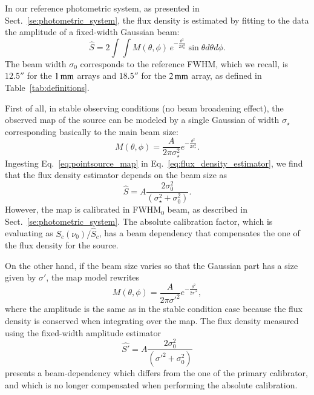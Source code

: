 In our reference photometric system, as presented in
Sect.~\ref{se:photometric_system}, 
the flux density is estimated by fitting to the data the amplitude of a fixed-width
Gaussian beam:
\begin{equation}
  \hat{S}  = 2 \int \int M(\theta, \phi)\, e^{-\frac{\theta^{2}}{2\sigma_{0}^{2}}} \sin \theta d\theta d\phi.
  \label{eq:flux_density_estimator}
\end{equation}
The beam width $\sigma_{0}$ corresponds to the
reference FWHM, which we recall, is $12.5''$ for the $1\,\rm{mm}$ arrays and $18.5''$ for
the $2\,\rm{mm}$ array, as defined in Table~\ref{tab:definitions}.

First of all, in stable observing conditions (no beam
broadening effect), the observed map of the source can be modeled by a single Gaussian of
width $\sigma_\star$ corresponding basically to the main beam size:
\begin{equation}
  M(\theta, \phi) = \frac{A}{2 \pi \sigma_\star^{2}} e^{-\frac{\theta^{2}}{2\sigma_\star^{2}}}.
  \label{eq:pointsource_map}
\end{equation}
Ingesting Eq.~\ref{eq:pointsource_map} in
Eq.~\ref{eq:flux_density_estimator}, we find that the flux density
estimator depends on the beam size as
\begin{equation}
  \hat{S}  = A \frac{2 \sigma_0^2}{(\sigma_{\star}^2 + \sigma_0^2)}.
\end{equation}
However, the map is calibrated in FWHM$_0$ beam, as described in
Sect.~\ref{se:photometric_system}. The absolute calibration factor,
which is evaluating as
$S_{c}(\nu_{0})/\hat{S}_{c}$, has a beam dependency that
compensates the one of the flux density for the source.

On the other hand, if the beam size varies so that the Gaussian part has a size given by
$\sigma'$, the map model rewrites  
\begin{equation}
  M(\theta, \phi) = \frac{A}{2 \pi \sigma'^{2}} e^{-\frac{\theta^{2}}{2\sigma'^{2}}},
  \label{eq:broader_beam_map}
\end{equation}
where the amplitude is the same as in the stable condition case
because the flux density is conserved when integrating over the map. 
The flux density measured using the fixed-width amplitude estimator 
\begin{equation}
  \hat{S'}  = A \frac{2 \sigma_0^2}{(\sigma'^2 + \sigma_0^2)}
\end{equation}
presents a beam-dependency which differs from the one of the primary
calibrator, and which is no longer compensated when performing the
absolute calibration.

